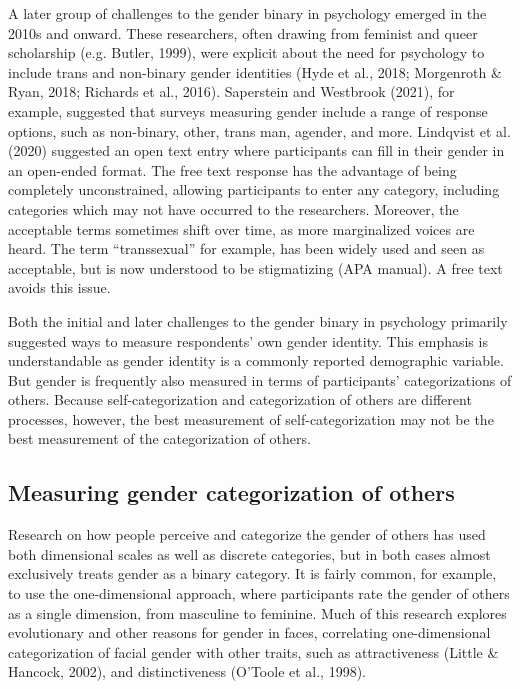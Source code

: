 \documentclass[
  man,
  longtable,
  nolmodern,
  notxfonts,
  notimes,
  colorlinks=true,linkcolor=blue,citecolor=blue,urlcolor=blue]{apa7}
\begin{document}
A later group of challenges to the gender binary in psychology emerged
in the 2010s and onward. These researchers, often drawing from feminist
and queer scholarship (e.g. Butler, 1999), were explicit about the need
for psychology to include trans and non-binary gender identities (Hyde
et al., 2018; Morgenroth \& Ryan, 2018; Richards et al., 2016).
Saperstein and Westbrook (2021), for example, suggested that surveys
measuring gender include a range of response options, such as
non-binary, other, trans man, agender, and more. Lindqvist et al. (2020)
suggested an open text entry where participants can fill in their gender
in an open-ended format. The free text response has the advantage of
being completely unconstrained, allowing participants to enter any
category, including categories which may not have occurred to the
researchers. Moreover, the acceptable terms sometimes shift over time,
as more marginalized voices are heard. The term ``transsexual'' for
example, has been widely used and seen as acceptable, but is now
understood to be stigmatizing (APA manual). A free text avoids this
issue.

Both the initial and later challenges to the gender binary in psychology
primarily suggested ways to measure respondents' own gender identity.
This emphasis is understandable as gender identity is a commonly
reported demographic variable. But gender is frequently also measured in
terms of participants' categorizations of others. Because
self-categorization and categorization of others are different
processes, however, the best measurement of self-categorization may not
be the best measurement of the categorization of others.

\subsection{Measuring gender categorization of
others}\label{measuring-gender-categorization-of-others}

Research on how people perceive and categorize the gender of others has
used both dimensional scales as well as discrete categories, but in both
cases almost exclusively treats gender as a binary category. It is
fairly common, for example, to use the one-dimensional approach, where
participants rate the gender of others as a single dimension, from
masculine to feminine. Much of this research explores evolutionary and
other reasons for gender in faces, correlating one-dimensional
categorization of facial gender with other traits, such as
attractiveness (Little \& Hancock, 2002), and distinctiveness (O'Toole
et al., 1998).
\end{document}
